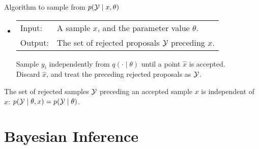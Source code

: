 \begin{algo}{Algorithm to sample from $p(\mathcal{Y}\mid x,\theta)$ } \label{alg:rej_sim}
  \begin{itemize}
    \item[]
\begin{tabular}{p{.9cm}p{12.2cm}}
{Input:}  & A sample $x$, and the parameter value ${\theta}$. \\
{Output:} & The set of rejected proposals $\mathcal{Y}$ preceding $x$.\\
\end{tabular}
\begin{tabbing}
  \enspace Sample $y_i$ independently from $q(\cdot\mid\theta)$ until a point $\hat{x}$ is accepted.\\
  \enspace Discard $\hat{x}$, and treat the preceding rejected proposals  as $\mathcal{Y}$.
\end{tabbing}
\end{itemize}
\end{algo}


\begin{proposition}
  The set of rejected samples $\mathcal{Y}$ preceding an accepted sample $x$ is independent of $x$: $p(\mathcal{Y}\mid\theta,x) = p(\mathcal{Y}\mid\theta)$. 
\label{prop:rej_post}
\end{proposition}  

\section{Bayesian Inference}
